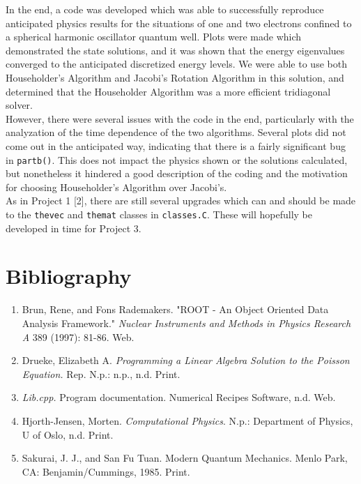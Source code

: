 \documentclass[12pt]{article}
\numberwithin{equation}{section}
\begin{document}
In the end, a code was developed which was able to successfully reproduce anticipated physics results for the situations of one and two electrons confined to a spherical harmonic oscillator quantum well.  Plots were made which demonstrated the state solutions, and it was shown that the energy eigenvalues converged to the anticipated discretized energy levels.  We were able to use both Householder's Algorithm and Jacobi's Rotation Algorithm in this solution, and determined that the Householder Algorithm was a more efficient tridiagonal solver.
\\\indent However, there were several issues with the code in the end, particularly with the analyzation of the time dependence of the two algorithms.  Several plots did not come out in the anticipated way, indicating that there is a fairly significant bug in \texttt{partb()}.  This does not impact the physics shown or the solutions calculated, but nonetheless it hindered a good description of the coding and the motivation for choosing Householder's Algorithm over Jacobi's.
\\\indent As in Project 1 [2], there are still several upgrades which can and should be made to the \texttt{thevec} and \texttt{themat} classes in \texttt{classes.C}.  These will hopefully be developed in time for Project 3.

\section{Bibliography}
\label{sec:bib}

\begin{enumerate}

\item Brun, Rene, and Fons Rademakers. "ROOT - An Object Oriented Data Analysis Framework." \textit{Nuclear Instruments and Methods in Physics Research A} 389 (1997): 81-86. Web.
\item Drueke, Elizabeth A. \textit{Programming a Linear Algebra Solution to the Poisson Equation.} Rep. N.p.: n.p., n.d. Print.
\item \textit{Lib.cpp.} Program documentation. Numerical Recipes Software, n.d. Web.
\item Hjorth-Jensen, Morten. \textit{Computational Physics}. N.p.: Department of Physics, U of Oslo, n.d. Print.
\item Sakurai, J. J., and San Fu Tuan. Modern Quantum Mechanics. Menlo Park, CA: Benjamin/Cummings, 1985. Print.

\end{enumerate}
\end{document}
